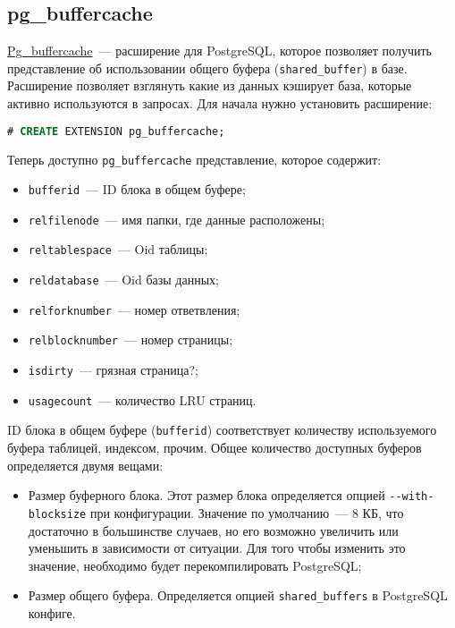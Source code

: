 \subsection{pg\_buffercache}

\href{http://www.postgresql.org/docs/current/static/pgbuffercache.html}{Pg\_buffercache}~--- расширение для PostgreSQL, которое позволяет получить представление об использовании общего буфера (\lstinline!shared_buffer!) в базе. Расширение позволяет взглянуть какие из данных кэширует база, которые активно используются в запросах. Для начала нужно установить расширение:

\begin{lstlisting}[language=SQL,label=lst:pgbuffercache1,caption=pg\_buffercache]
# CREATE EXTENSION pg_buffercache;
\end{lstlisting}

Теперь доступно \lstinline!pg_buffercache! представление, которое содержит:

\begin{itemize}
  \item \lstinline!bufferid!~--- ID блока в общем буфере;
  \item \lstinline!relfilenode!~--- имя папки, где данные расположены;
  \item \lstinline!reltablespace!~--- Oid таблицы;
  \item \lstinline!reldatabase!~--- Oid базы данных;
  \item \lstinline!relforknumber!~--- номер ответвления;
  \item \lstinline!relblocknumber!~--- номер страницы;
  \item \lstinline!isdirty!~--- грязная страница?;
  \item \lstinline!usagecount!~--- количество LRU страниц.
\end{itemize}

ID блока в общем буфере (\lstinline!bufferid!) соответствует количеству используемого буфера таблицей, индексом, прочим. Общее количество доступных буферов определяется двумя вещами:

\begin{itemize}
  \item Размер буферного блока. Этот размер блока определяется опцией \lstinline!--with-blocksize! при конфигурации. Значение по умолчанию~--- 8 КБ, что достаточно в большинстве случаев, но его возможно увеличить или уменьшить в зависимости от ситуации. Для того чтобы изменить это значение, необходимо будет перекомпилировать PostgreSQL;
  \item Размер общего буфера. Определяется опцией \lstinline!shared_buffers! в PostgreSQL конфиге.
\end{itemize}

